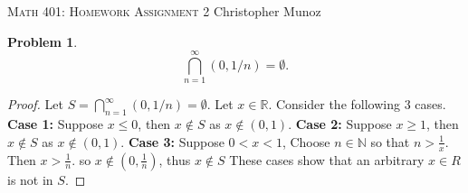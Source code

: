 \documentclass[12pt]{article}
\newtheorem{problem}{Problem}
\newcommand{\RR}{\ensuremath{\mathbb R}}
\newcommand{\NN}{\ensuremath{\mathbb N}}
\begin{document}
\small
\noindent \textsc{Math 401: Homework Assignment 2} \hfill Christopher Munoz

\normalsize
\bigskip

\setcounter{problem}{5}



\begin{problem} %
    $$\bigcap_{n=1}^\infty (0,1/n)=\emptyset.$$
\end{problem}


\begin{proof}
	Let $S = \bigcap\limits_{n=1}^{\infty} (0,1/n) = \emptyset$. Let $x \in \RR$. Consider the following 3 cases. \newline
	\textbf{Case 1: } Suppose $x \leq 0$, then $x \notin S$ as $x \notin (0,1)$. \newline
	\textbf{Case 2: } Suppose $x \geq 1$, then $x \notin S$ as $x \notin (0,1)$. \newline
	\textbf{Case 3: } Suppose $0 < x < 1$, Choose $n \in \NN$ so that $n > \frac{1}{x}$. Then $x > \frac{1}{n}$. so $x \notin (0, \frac{1}{n})$, thus $x \notin S$
	\newline
	These cases show that an arbitrary $x \in R$ is not in $S$.
\end{proof}
\end{document}
